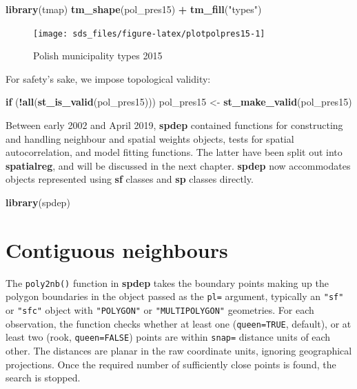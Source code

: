 \documentclass[]{book}
\newenvironment{Shaded}{\begin{snugshade}}{\end{snugshade}}
\newcommand{\ControlFlowTok}[1]{\textcolor[rgb]{0.13,0.29,0.53}{\textbf{#1}}}
\newcommand{\KeywordTok}[1]{\textcolor[rgb]{0.13,0.29,0.53}{\textbf{#1}}}
\newcommand{\NormalTok}[1]{#1}
\newcommand{\OperatorTok}[1]{\textcolor[rgb]{0.81,0.36,0.00}{\textbf{#1}}}
\newcommand{\StringTok}[1]{\textcolor[rgb]{0.31,0.60,0.02}{#1}}
\begin{document}
\begin{Shaded}
\begin{Highlighting}[]
\KeywordTok{library}\NormalTok{(tmap)}
\KeywordTok{tm_shape}\NormalTok{(pol_pres15) }\OperatorTok{+}\StringTok{ }\KeywordTok{tm_fill}\NormalTok{(}\StringTok{"types"}\NormalTok{)}
\end{Highlighting}
\end{Shaded}

\begin{figure}

{\centering \texttt{[image: sds\_files/figure-latex/plotpolpres15-1]} 

}

\caption{Polish municipality types 2015}\label{fig:plotpolpres15}
\end{figure}

For safety's sake, we impose topological validity:

\begin{Shaded}
\begin{Highlighting}[]
\ControlFlowTok{if}\NormalTok{ (}\OperatorTok{!}\KeywordTok{all}\NormalTok{(}\KeywordTok{st_is_valid}\NormalTok{(pol_pres15))) pol_pres15 <-}\StringTok{ }\KeywordTok{st_make_valid}\NormalTok{(pol_pres15)}
\end{Highlighting}
\end{Shaded}

Between early 2002 and April 2019, \textbf{spdep} contained functions for constructing and handling neighbour and spatial weights objects, tests for spatial autocorrelation, and model fitting functions. The latter have been split out into \textbf{spatialreg}, and will be discussed in the next chapter. \textbf{spdep} \citep{R-spdep} now accommodates objects represented using \textbf{sf} classes and \textbf{sp} classes directly.

\begin{Shaded}
\begin{Highlighting}[]
\KeywordTok{library}\NormalTok{(spdep)}
\end{Highlighting}
\end{Shaded}

\hypertarget{contiguous-neighbours}{%
\section{Contiguous neighbours}\label{contiguous-neighbours}}

The \texttt{poly2nb()} function in \textbf{spdep} takes the boundary points making up the polygon boundaries in the object passed as the \texttt{pl=} argument, typically an \texttt{"sf"} or \texttt{"sfc"} object with \texttt{"POLYGON"} or \texttt{"MULTIPOLYGON"} geometries. For each observation, the function checks whether at least one (\texttt{queen=TRUE}, default), or at least two (rook, \texttt{queen=FALSE}) points are within \texttt{snap=} distance units of each other. The distances are planar in the raw coordinate units, ignoring geographical projections. Once the required number of sufficiently close points is found, the search is stopped.
\end{document}

